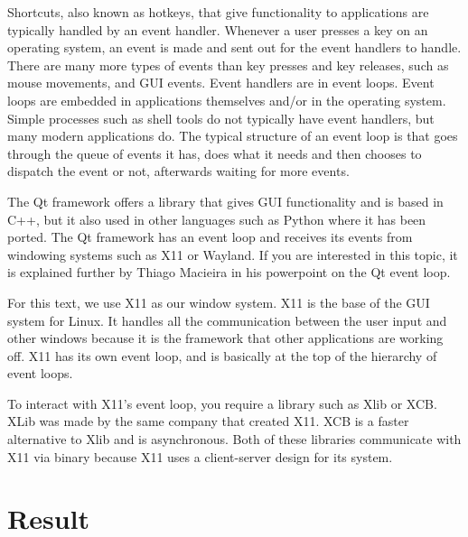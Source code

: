 \documentclass[12pt]{article}
\begin{document}
	
Shortcuts, also known as hotkeys, that give functionality to applications are typically handled by an event handler.
Whenever a user presses a key on an operating system, an event is made and sent out for the event handlers to handle.
There are many more types of events than key presses and key releases, such as mouse movements, and GUI events.
Event handlers are in event loops. Event loops are embedded in applications themselves and/or in the operating system. Simple processes such as shell tools do not typically have event handlers, but many modern applications do. The typical structure of an event loop is that goes through the queue of events it has, does what it needs and then chooses to dispatch the event or not, afterwards waiting for more events. 

The Qt framework offers a library that gives GUI functionality and is based in C++, but it also used in other languages such as Python where it has been ported.
The Qt framework has an event loop and receives its events from windowing systems such as X11 or Wayland.
If you are interested in this topic, it is explained further by Thiago Macieira in his powerpoint on the Qt event loop\cite{QtSlides}.

For this text, we use X11 as our window system.
X11 is the base of the GUI system for Linux.
It handles all the communication between the user input and other windows because it is the framework that other applications are working off.
X11 has its own event loop, and is basically at the top of the hierarchy of event loops.

To interact with X11's event loop, you require a library such as Xlib or XCB.
XLib was made by the same company that created X11.
XCB is a faster alternative to Xlib and is asynchronous.
Both of these libraries communicate with X11 via binary because X11 uses a client-server design for its system.


	
\section{Result}
\end{document}
